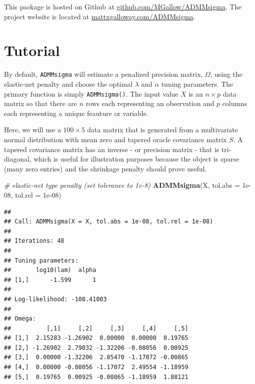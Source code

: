 \documentclass[11pt,]{report}
\newenvironment{Shaded}{\begin{snugshade}}{\end{snugshade}}
\newcommand{\CommentTok}[1]{\textcolor[rgb]{0.56,0.35,0.01}{\textit{#1}}}
\newcommand{\DataTypeTok}[1]{\textcolor[rgb]{0.13,0.29,0.53}{#1}}
\newcommand{\FloatTok}[1]{\textcolor[rgb]{0.00,0.00,0.81}{#1}}
\newcommand{\KeywordTok}[1]{\textcolor[rgb]{0.13,0.29,0.53}{\textbf{#1}}}
\newcommand{\NormalTok}[1]{#1}
\theoremstyle{definition}
\theoremstyle{definition}
\theoremstyle{definition}
\theoremstyle{remark}
\begin{document}
\vspace{0.5cm}

This package is hosted on Github at \href{https://github.com/MGallow/ADMMsigma}{github.com/MGallow/ADMMsigma}. The project website is located at \href{http://mattxgalloway.com/ADMMsigma/}{mattxgalloway.com/ADMMsigma}.

\hypertarget{tutorial}{%
\section{Tutorial}\label{tutorial}}

By default, \texttt{ADMMsigma} will estimate a penalized precision matrix, \(\Omega\), using the elastic-net penalty and choose the optimal \(\lambda\) and \(\alpha\) tuning parameters. The primary function is simply \texttt{ADMMsigma()}. The input value \(X\) is an \(n \times p\) data matrix so that there are \(n\) rows each representing an observation and \(p\) columns each representing a unique feauture or variable.

Here, we will use a \(100 \times 5\) data matrix that is generated from a multivariate normal distribution with mean zero and tapered oracle covariance matrix \(S\). A tapered covariance matrix has an inverse - or precision matrix - that is tri-diagonal, which is useful for illustration purposes because the object is sparse (many zero entries) and the shrinkage penalty should prove useful.

\vspace{0.5cm}

\begin{Shaded}
\begin{Highlighting}[]
\CommentTok{# elastic-net type penalty (set tolerance to 1e-8)}
\KeywordTok{ADMMsigma}\NormalTok{(X, }\DataTypeTok{tol.abs =} \FloatTok{1e-08}\NormalTok{, }\DataTypeTok{tol.rel =} \FloatTok{1e-08}\NormalTok{)}
\end{Highlighting}
\end{Shaded}

\begin{verbatim}
## 
## Call: ADMMsigma(X = X, tol.abs = 1e-08, tol.rel = 1e-08)
## 
## Iterations: 48
## 
## Tuning parameters:
##       log10(lam)  alpha
## [1,]      -1.599      1
## 
## Log-likelihood: -108.41003
## 
## Omega:
##          [,1]     [,2]     [,3]     [,4]     [,5]
## [1,]  2.15283 -1.26902  0.00000  0.00000  0.19765
## [2,] -1.26902  2.79032 -1.32206 -0.08056  0.00925
## [3,]  0.00000 -1.32206  2.85470 -1.17072 -0.00865
## [4,]  0.00000 -0.08056 -1.17072  2.49554 -1.18959
## [5,]  0.19765  0.00925 -0.00865 -1.18959  1.88121
\end{verbatim}
\end{document}
